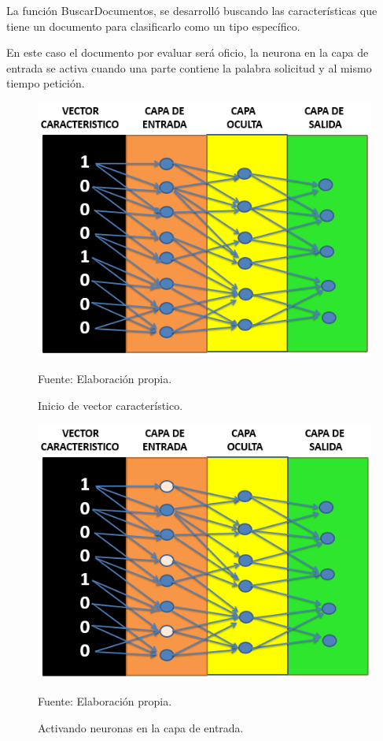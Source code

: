 La función BuscarDocumentos, se desarrolló buscando las características que tiene un documento para clasificarlo como un tipo específico.

En este caso el documento por evaluar será oficio, la neurona en la capa de entrada se activa cuando una parte contiene la palabra solicitud y al mismo tiempo petición.

\begin{figure}[h!]
	\centering
		\includegraphics[scale=0.6]{imagenes/IniciovectorCaracteristico.png}
		\caption{Inicio de vector característico.}
	\begin{center}
    Fuente: Elaboración propia.
    \end{center}
	\label{fig:IniciovectorCaracteristico}
\end{figure}

\begin{figure}[h!]
	\centering
		\includegraphics[scale=0.6]{imagenes/IniciocapaEntrada.png}
		\caption{Activando neuronas en la capa de entrada.}
	\begin{center}
    Fuente: Elaboración propia.
    \end{center}
	\label{fig:IniciocapaEntrada}
\end{figure}

